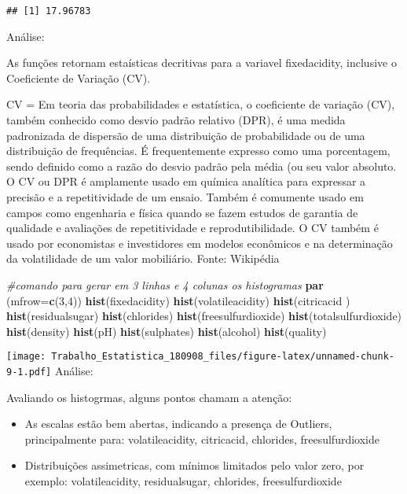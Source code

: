\documentclass[]{article}
\newenvironment{Shaded}{\begin{snugshade}}{\end{snugshade}}
\newcommand{\KeywordTok}[1]{\textcolor[rgb]{0.13,0.29,0.53}{\textbf{#1}}}
\newcommand{\DataTypeTok}[1]{\textcolor[rgb]{0.13,0.29,0.53}{#1}}
\newcommand{\DecValTok}[1]{\textcolor[rgb]{0.00,0.00,0.81}{#1}}
\newcommand{\CommentTok}[1]{\textcolor[rgb]{0.56,0.35,0.01}{\textit{#1}}}
\newcommand{\NormalTok}[1]{#1}
\begin{document}
\begin{verbatim}
## [1] 17.96783
\end{verbatim}

Análise:

As funções retornam estaísticas decritivas para a variavel fixedacidity,
inclusive o Coeficiente de Variação (CV).

CV = Em teoria das probabilidades e estatística, o coeficiente de
variação (CV), também conhecido como desvio padrão relativo (DPR), é uma
medida padronizada de dispersão de uma distribuição de probabilidade ou
de uma distribuição de frequências. É frequentemente expresso como uma
porcentagem, sendo definido como a razão do desvio padrão pela média (ou
seu valor absoluto. O CV ou DPR é amplamente usado em química analítica
para expressar a precisão e a repetitividade de um ensaio. Também é
comumente usado em campos como engenharia e física quando se fazem
estudos de garantia de qualidade e avaliações de repetitividade e
reprodutibilidade. O CV também é usado por economistas e investidores em
modelos econômicos e na determinação da volatilidade de um valor
mobiliário. Fonte: Wikipédia

\begin{Shaded}
\begin{Highlighting}[]
\CommentTok{#comando para gerar em 3 linhas e 4 colunas os histogramas}
\KeywordTok{par}\NormalTok{ (}\DataTypeTok{mfrow=}\KeywordTok{c}\NormalTok{(}\DecValTok{3}\NormalTok{,}\DecValTok{4}\NormalTok{))}
\KeywordTok{hist}\NormalTok{(fixedacidity)}
\KeywordTok{hist}\NormalTok{(volatileacidity)}
\KeywordTok{hist}\NormalTok{(citricacid )}
\KeywordTok{hist}\NormalTok{(residualsugar)}
\KeywordTok{hist}\NormalTok{(chlorides)}
\KeywordTok{hist}\NormalTok{(freesulfurdioxide)}
\KeywordTok{hist}\NormalTok{(totalsulfurdioxide)}
\KeywordTok{hist}\NormalTok{(density)}
\KeywordTok{hist}\NormalTok{(pH)}
\KeywordTok{hist}\NormalTok{(sulphates)}
\KeywordTok{hist}\NormalTok{(alcohol)}
\KeywordTok{hist}\NormalTok{(quality)}
\end{Highlighting}
\end{Shaded}

\texttt{[image: Trabalho\_Estatistica\_180908\_files/figure-latex/unnamed-chunk-9-1.pdf]}
Análise:

Avaliando os histogrmas, alguns pontos chamam a atenção:

\begin{itemize}
\item
  As escalas estão bem abertas, indicando a presença de Outliers,
  principalmente para: volatileacidity, citricacid, chlorides,
  freesulfurdioxide
\item
  Distribuições assimetricas, com mínimos limitados pelo valor zero, por
  exemplo: volatileacidity, residualsugar, chlorides, freesulfurdioxide
\end{itemize}
\end{document}
